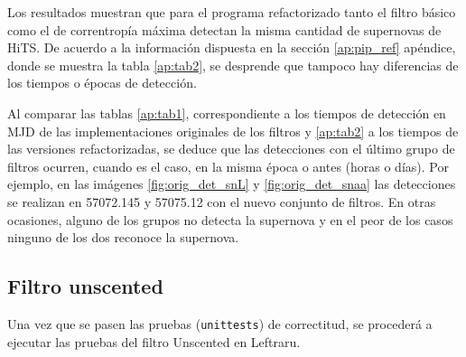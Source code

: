 Los resultados muestran que para el programa refactorizado tanto el filtro b\'asico como el de correntrop\'ia m\'axima detectan la misma cantidad de supernovas de HiTS. De acuerdo a la informaci\'on dispuesta en la secci\'on \ref{ap:pip_ref} ap\'endice, donde se muestra la tabla \ref{ap:tab2}, se desprende que tampoco hay diferencias de los tiempos o \'epocas de detecci\'on.
\bigskip

Al comparar las tablas \ref{ap:tab1}, correspondiente a los tiempos de detecci\'on en MJD de las implementaciones originales de los filtros y \ref{ap:tab2} a los tiempos de las versiones refactorizadas, se deduce que las detecciones con el \'ultimo grupo de filtros ocurren, cuando es el caso, en la misma \'epoca o antes (horas o d\'ias). Por ejemplo, en las im\'agenes \ref{fig:orig_det_snL} y  \ref{fig:orig_det_snaa} las detecciones se realizan en 57072.145 y 57075.12 con el nuevo conjunto de filtros.
En otras ocasiones, alguno de los grupos no detecta la supernova y en el peor de los casos ninguno de los dos reconoce la supernova.
\bigskip
  

\subsection{Filtro unscented}
Una vez que se pasen las pruebas (\texttt{unittests}) de correctitud, se proceder\'a a ejecutar las pruebas del filtro Unscented en Leftraru.